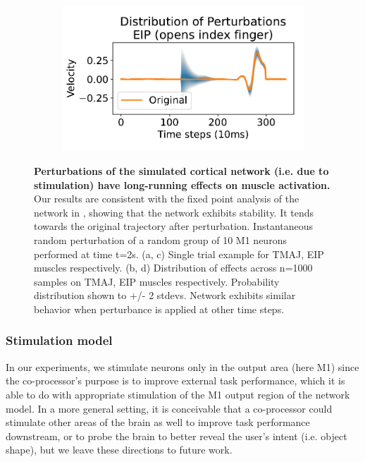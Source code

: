 \documentclass[12pt]{iopart}
\begin{document}
\begin{figure}[h]
\begin{subfigure}[c]{0.48\textwidth}
	    \caption{}
	\end{subfigure}
	\hfill
	\begin{subfigure}[c]{0.48\textwidth}
	    \centering
	    \includegraphics[width=\textwidth]{perturbe_dist_eip.pdf}
	    \caption{}
	\end{subfigure}
	\hfill
	\caption{\textbf{Perturbations of the simulated cortical network (i.e. due to stimulation)
	         have long-running effects on muscle activation.} Our results are consistent with
	         the fixed point analysis of the network in \cite{michaels.mrnn}, showing that the network
	         exhibits stability. It tends towards the original trajectory after perturbation.
	         Instantaneous random perturbation of a random group of 10 M1
	         neurons performed at time t=2s. (a, c) Single trial example for TMAJ, EIP muscles
	         respectively. (b, d) Distribution of effects across n=1000 samples on TMAJ, EIP muscles
	         respectively. Probability distribution shown to +/- 2 stdevs. Network exhibits similar
	         behavior when perturbance is applied at other time steps.}
	\label{fig:dynamics}
\end{figure}

\subsubsection{Stimulation model}
In our experiments, we stimulate neurons only in the output area (here M1) since the co-processor's
purpose is to improve external task performance, which it is able to do with
appropriate stimulation of the M1 output region of the network model. In a more general setting, it is
conceivable that a co-processor could stimulate other areas of the brain as well to improve task
performance downstream, or to probe the brain to better reveal the user's intent (i.e. object
shape), but we leave these directions to future work.
\end{document}
